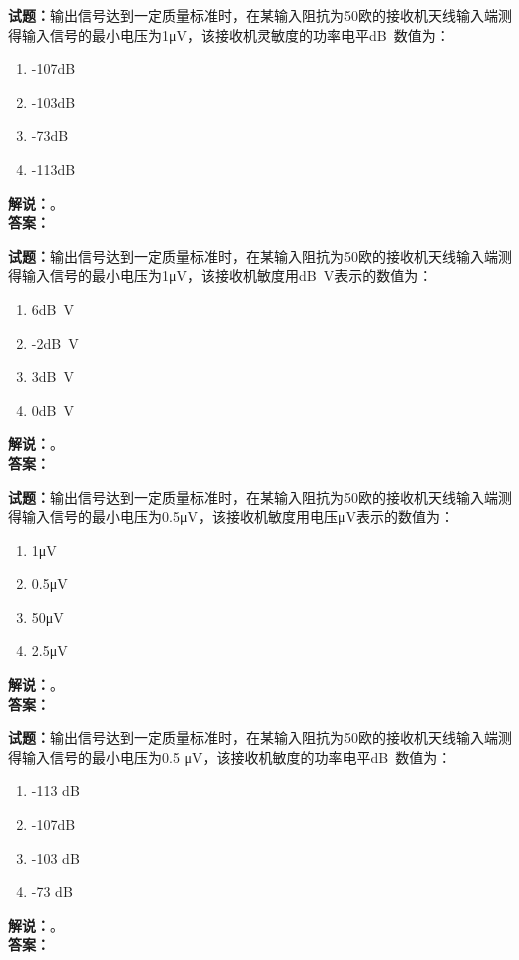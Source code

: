 \documentclass{ctexbook}
\begin{document}
\noindent\textbf{试题：}输出信号达到一定质量标准时，在某输入阻抗为50欧的接收机天线输入端测得输入信号的最小电压为1μV，该接收机灵敏度的功率电平\unit[qualifier-mode=combine]{\deci\bel{}}数值为：
\begin{enumerate}[leftmargin=3em]
  \item -107\unit[qualifier-mode=combine]{\deci\bel{}}
  \item -103\unit[qualifier-mode=combine]{\deci\bel{}}
  \item -73\unit[qualifier-mode=combine]{\deci\bel{}}
  \item -113\unit[qualifier-mode=combine]{\deci\bel{}}
\end{enumerate}
\noindent\textbf{解说：}\textbf{}。\\\noindent\textbf{答案：}

\bigskip

\noindent\textbf{试题：}输出信号达到一定质量标准时，在某输入阻抗为50欧的接收机天线输入端测得输入信号的最小电压为1μV，该接收机敏度用\unit[qualifier-mode=combine]{\deci\bel{}}V表示的数值为：
\begin{enumerate}[leftmargin=3em]
  \item 6\unit[qualifier-mode=combine]{\deci\bel{}}V
  \item -2\unit[qualifier-mode=combine]{\deci\bel{}}V
  \item 3\unit[qualifier-mode=combine]{\deci\bel{}}V
  \item 0\unit[qualifier-mode=combine]{\deci\bel{}}V
\end{enumerate}
\noindent\textbf{解说：}\textbf{}。\\\noindent\textbf{答案：}

\bigskip

\noindent\textbf{试题：}输出信号达到一定质量标准时，在某输入阻抗为50欧的接收机天线输入端测得输入信号的最小电压为0.5μV，该接收机敏度用电压μV表示的数值为：
\begin{enumerate}[leftmargin=3em]
  \item 1μV
  \item 0.5μV
  \item 50μV
  \item 2.5μV
\end{enumerate}
\noindent\textbf{解说：}\textbf{}。\\\noindent\textbf{答案：}

\bigskip

\noindent\textbf{试题：}输出信号达到一定质量标准时，在某输入阻抗为50欧的接收机天线输入端测得输入信号的最小电压为0.5 μV，该接收机敏度的功率电平\unit[qualifier-mode=combine]{\deci\bel{}}数值为：
\begin{enumerate}[leftmargin=3em]
  \item -113 \unit[qualifier-mode=combine]{\deci\bel{}}
  \item -107\unit[qualifier-mode=combine]{\deci\bel{}}
  \item -103 \unit[qualifier-mode=combine]{\deci\bel{}}
  \item -73 \unit[qualifier-mode=combine]{\deci\bel{}}
\end{enumerate}
\noindent\textbf{解说：}\textbf{}。\\\noindent\textbf{答案：}
\end{document}
